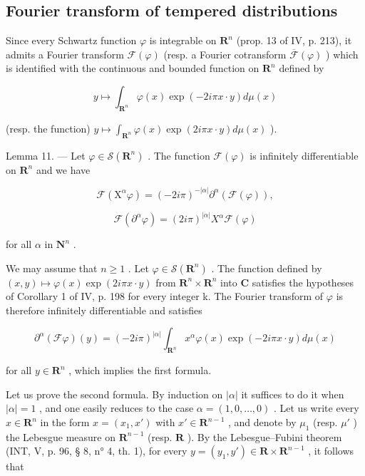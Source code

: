 \subsection{Fourier transform of tempered distributions}

Since every Schwartz function \(\varphi\) is integrable on \(\mathbf{R}^n\) (prop. 13 of IV, p. 213), it admits a Fourier transform \(\mathcal{F}(\varphi)\) (resp. a Fourier cotransform \(\overline{\mathcal{F}}(\varphi)\) ) which is identified with the continuous and bounded function on \(\mathbf{R}^n\) defined by

\[
y \mapsto \int_ {\mathbf {R} ^ {n}} \varphi (x) \exp (- 2 i \pi x \cdot y) d \mu (x)
\]

(resp. the function) \(y \mapsto \int_{\mathbf{R}^n} \varphi(x) \exp(2i\pi x \cdot y) d\mu(x)\) ).

Lemma 11. --- Let \(\varphi\in\mathcal{S}(\mathbf{R}^{n})\) . The function \(\mathcal{F}(\varphi)\) is infinitely differentiable on \(\mathbf{R}^{n}\) and we have

\[
\mathcal {F} (\mathrm{X} ^ {\alpha} \varphi) = (- 2 i \pi) ^ {- | \alpha |} \partial^ {\alpha} (\mathcal {F} (\varphi)),
\]

\[
\mathcal {F} (\partial^ {\alpha} \varphi) = (2 i \pi) ^ {| \alpha |} X ^ {\alpha} \mathcal {F} (\varphi)
\]

for all \(\alpha\) in \(\mathbf{N}^n\) .

We may assume that \(n \geqslant 1\) . Let \(\varphi \in \mathcal{S}(\mathbf{R}^{n})\) . The function defined by \((x, y) \mapsto \varphi(x) \exp(2i\pi x \cdot y)\) from \(\mathbf{R}^{n} \times \mathbf{R}^{n}\) into \(\mathbf{C}\) satisfies the hypotheses of Corollary 1 of IV, p. 198 for every integer k. The Fourier transform of \(\varphi\) is therefore infinitely differentiable and satisfies

\[
\partial^ {\alpha} (\mathcal {F} \varphi) (y) = (- 2 i \pi) ^ {| \alpha |} \int_ {\mathbf {R} ^ {n}} x ^ {\alpha} \varphi (x) \exp (- 2 i \pi x \cdot y) d \mu (x)
\]

for all \(y \in \mathbf{R}^{n}\) , which implies the first formula.

Let us prove the second formula. By induction on \(|\alpha|\) it suffices to do it when \(|\alpha| = 1\) , and one easily reduces to the case \(\alpha = (1,0,\ldots,0)\) . Let us write every \(x \in \mathbf{R}^n\) in the form \(x = (x_1,x')\) with \(x' \in \mathbf{R}^{n-1}\) , and denote by \(\mu_1\) (resp. \(\mu'\) ) the Lebesgue measure on \(\mathbf{R}^{n-1}\) (resp. \(\mathbf{R}\) ). By the Lebesgue--Fubini theorem (INT, V, p. 96, § 8, n° 4, th. 1), for every \(y = (y_1,y') \in \mathbf{R} \times \mathbf{R}^{n-1}\) , it follows that

